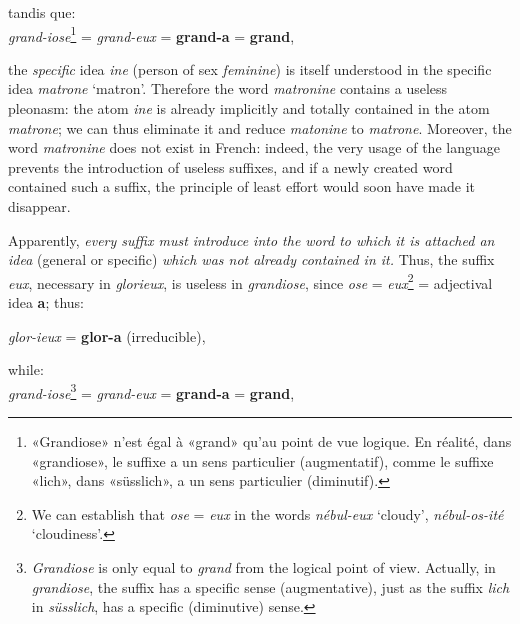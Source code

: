 \begin{sloppypar}
{  \noindent
  tandis que:\\[1ex]
  
  \noindent
  {\small \emph{grand-iose}\footnote{«Grandiose» n’est égal à «grand»
      qu'au point de vue logique. En réalité, dans «grandiose», le
      suffixe a un sens particulier (augmentatif), comme le suffixe
      «lich», dans «süsslich», a un sens particulier (diminutif).} =
    \emph{grand-eux} = \textbf{grand-a} = \textbf{grand}, }

}
%
{\noindent
  the \emph{specific} idea \emph{ine} (person of sex \emph{feminine}) is
  itself understood in the specific idea \emph{matrone}
  `matron'. Therefore the word \emph{matronine} contains a useless
  pleonasm: the atom \emph{ine} is already implicitly and totally
  contained in the atom \emph{matrone}; we can thus eliminate it and
  reduce \emph{matonine} to \emph{matrone}. Moreover, the word \emph{matronine}
  does not exist in French: indeed, the very usage of the language
  prevents the introduction of useless suffixes, and if a newly
  created word contained such a suffix, the principle of least effort
  would soon have made it disappear.

  Apparently, \emph{every suffix must introduce into the word to which
    it is attached an idea} (general or specific) \emph{which was not
    already contained in it.} Thus, the suffix \emph{eux}, necessary
  in \emph{glorieux}, is useless in \emph{grandiose}, since \emph{ose}
  = \emph{eux}\footnote{We can establish that \emph{ose} = \emph{eux}
    in the words \emph{nébul-eux} `cloudy', \emph{nébul-os-ité}
    `cloudiness'.} = adjectival idea \textbf{a}; thus:

  \begin{center}
    \emph{glor-ieux} = \textbf{glor-a} (irreducible),
  \end{center}

  \noindent
  while:\\[1ex]
  
  \noindent
  {\small \emph{grand-iose}\footnote{\emph{Grandiose} is only equal to
      \emph{grand} from the logical point of view. Actually, in
      \emph{grandiose}, the suffix has a specific sense
      (augmentative), just as the suffix \emph{lich} in
      \emph{süsslich}, has a specific (diminutive) sense.} =
    \emph{grand-eux} = \textbf{grand-a} = \textbf{grand}, }

}

\end{sloppypar}

